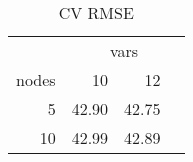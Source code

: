 \begin{table}

\caption{\label{tab:}CV RMSE}
\centering
\begin{tabular}[t]{r|r|r}
\hline
\multicolumn{1}{c|}{ } & \multicolumn{3}{c}{vars} \\
\cline{2-4}
nodes & 10 & 12\\
\hline
5 & 42.90 & 42.75\\
\hline
10 & 42.99 & 42.89\\
\hline
\end{tabular}
\end{table}